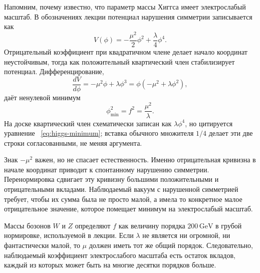 \begin{classroomqa}
\end{classroomqa}

Напомним, почему известно, что параметр массы Хиггса имеет электрослабый масштаб. В обозначениях лекции потенциал нарушения симметрии записывается как
\begin{equation}
V(\phi)=-\frac{\mu^2}{2}\phi^2+\frac{\lambda}{4}\phi^4.
\label{eq:higgs-potential}
\end{equation}
Отрицательный коэффициент при квадратичном члене делает начало координат неустойчивым, тогда как положительный квартический член стабилизирует потенциал. Дифференцирование,
\begin{equation}
\frac{dV}{d\phi}=-\mu^2\phi+\lambda\phi^3
=\phi(-\mu^2+\lambda\phi^2),
\end{equation}
даёт ненулевой минимум
\begin{equation}
\phi_{\min}^2=f^2=\frac{\mu^2}{\lambda}.
\label{eq:higgs-minimum}
\end{equation}
На доске квартический член схематически записан как \(\lambda\phi^4\), но цитируется уравнение ~\eqref{eq:higgs-minimum}; вставка обычного множителя \(1/4\) делает эти две строки согласованными, не меняя аргумента.

Знак \(-\mu^2\) важен, но не спасает естественность. Именно отрицательная кривизна в начале координат приводит к спонтанному нарушению симметрии. Перенормировка сдвигает эту кривизну большими положительными и отрицательными вкладами. Наблюдаемый вакуум с нарушенной симметрией требует, чтобы их сумма была не просто малой, а имела то конкретное малое отрицательное значение, которое помещает минимум на электрослабый масштаб.

Массы бозонов \(W\) и \(Z\) определяют \(f\) как величину порядка \(200\,\mathrm{GeV}\) в грубой нормировке, используемой в лекции. Если \(\lambda\) не является ни огромной, ни фантастически малой, то \(\mu\) должен иметь тот же общий порядок. Следовательно, наблюдаемый коэффициент электрослабого масштаба есть остаток вкладов, каждый из которых может быть на многие десятки порядков больше.


